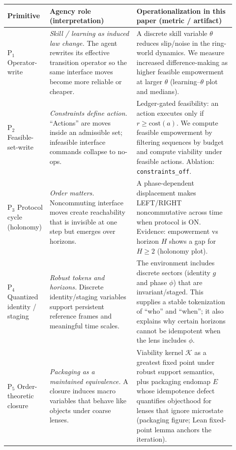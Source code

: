\documentclass[11pt]{article}
\newcommand{\K}{\mathcal{K}}
\begin{document}
\begin{table}[t]
\centering
\small
\begin{tabular}{@{}p{0.13\linewidth} p{0.37\linewidth} p{0.42\linewidth}@{}}
\toprule
\textbf{Primitive} & \textbf{Agency role (interpretation)} & \textbf{Operationalization in this paper (metric / artifact)} \\
\midrule
P$_1$ Operator-write &
\emph{Skill / learning as induced law change.} The agent rewrites its effective transition operator so the same interface moves become more reliable or cheaper. &
A discrete skill variable $\theta$ reduces slip/noise in the ring-world dynamics. We measure increased difference-making as higher feasible empowerment at larger $\theta$ (learning--$\theta$ plot and medians). \\[0.35em]

P$_2$ Feasible-set-write &
\emph{Constraints define action.} ``Actions'' are moves inside an admissible set; infeasible interface commands collapse to no-ops. &
Ledger-gated feasibility: an action executes only if $r \ge \mathrm{cost}(a)$. We compute feasible empowerment by filtering sequences by budget and compute viability under feasible actions. Ablation: \texttt{constraints\_off}. \\[0.35em]

P$_3$ Protocol cycle (holonomy) &
\emph{Order matters.} Noncommuting interface moves create reachability that is invisible at one step but emerges over horizons. &
A phase-dependent displacement makes LEFT/RIGHT noncommutative across time when protocol is ON. Evidence: empowerment vs horizon $H$ shows a gap for $H\ge 2$ (holonomy plot). \\[0.35em]

P$_4$ Quantized identity / staging &
\emph{Robust tokens and horizons.} Discrete identity/staging variables support persistent reference frames and meaningful time scales. &
The environment includes discrete sectors (identity $g$ and phase $\phi$) that are invariant/staged. This supplies a stable tokenization of ``who'' and ``when''; it also explains why certain horizons cannot be idempotent when the lens includes $\phi$. \\[0.35em]

P$_5$ Order-theoretic closure &
\emph{Packaging as a maintained equivalence.} A closure induces macro variables that behave like objects under coarse lenses. &
Viability kernel $\K$ as a greatest fixed point under robust support semantics, plus packaging endomap $E$ whose idempotence defect quantifies objecthood for lenses that ignore microstate (packaging figure; Lean fixed-point lemma anchors the iteration). \\[0.35em]


\end{tabular}
\end{table}
\end{document}
